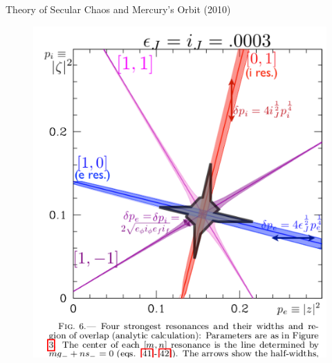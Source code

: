 \documentclass{beamer}
\begin{document}
\begin{frame}{Theory of Secular Chaos and Mercury's Orbit (2010)}
\begin{figure}[h]
\begin{minipage}[h]{0.65\linewidth}
\includegraphics[width=1\linewidth]{./10_4.png}
\end{minipage}
\end{figure}
\end{frame}
\end{document}
